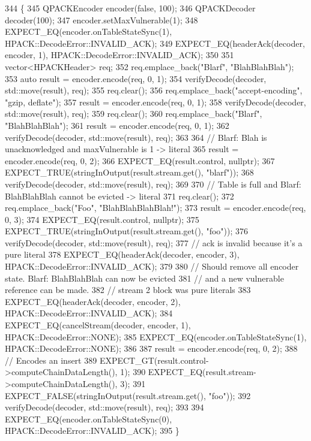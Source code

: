 \begin{DoxyCode}
344                                   \{
345   QPACKEncoder encoder(\textcolor{keyword}{false}, 100);
346   QPACKDecoder decoder(100);
347   encoder.setMaxVulnerable(1);
348   EXPECT\_EQ(encoder.onTableStateSync(1), HPACK::DecodeError::INVALID\_ACK);
349   EXPECT\_EQ(headerAck(decoder, encoder, 1), HPACK::DecodeError::INVALID\_ACK);
350 
351   vector<HPACKHeader> req;
352   req.emplace\_back(\textcolor{stringliteral}{"Blarf"}, \textcolor{stringliteral}{"BlahBlahBlah"});
353   \textcolor{keyword}{auto} result = encoder.encode(req, 0, 1);
354   verifyDecode(decoder, std::move(result), req);
355   req.clear();
356   req.emplace\_back(\textcolor{stringliteral}{"accept-encoding"}, \textcolor{stringliteral}{"gzip, deflate"});
357   result = encoder.encode(req, 0, 1);
358   verifyDecode(decoder, std::move(result), req);
359   req.clear();
360   req.emplace\_back(\textcolor{stringliteral}{"Blarf"}, \textcolor{stringliteral}{"BlahBlahBlah"});
361   result = encoder.encode(req, 0, 1);
362   verifyDecode(decoder, std::move(result), req);
363 
364   \textcolor{comment}{// Blarf: Blah is unacknowledged and maxVulnerable is 1 -> literal}
365   result = encoder.encode(req, 0, 2);
366   EXPECT\_EQ(result.control, \textcolor{keyword}{nullptr});
367   EXPECT\_TRUE(stringInOutput(result.stream.get(), \textcolor{stringliteral}{"blarf"}));
368   verifyDecode(decoder, std::move(result), req);
369 
370   \textcolor{comment}{// Table is full and Blarf: BlahBlahBlah cannot be evicted -> literal}
371   req.clear();
372   req.emplace\_back(\textcolor{stringliteral}{"Foo"}, \textcolor{stringliteral}{"BlahBlahBlahBlah!"});
373   result = encoder.encode(req, 0, 3);
374   EXPECT\_EQ(result.control, \textcolor{keyword}{nullptr});
375   EXPECT\_TRUE(stringInOutput(result.stream.get(), \textcolor{stringliteral}{"foo"}));
376   verifyDecode(decoder, std::move(result), req);
377   \textcolor{comment}{// ack is invalid because it's a pure literal}
378   EXPECT\_EQ(headerAck(decoder, encoder, 3), HPACK::DecodeError::INVALID\_ACK);
379 
380   \textcolor{comment}{// Should remove all encoder state.  Blarf: BlahBlahBlah can now be evicted}
381   \textcolor{comment}{// and a new vulnerable reference can be made.}
382   \textcolor{comment}{// stream 2 block was pure literals}
383   EXPECT\_EQ(headerAck(decoder, encoder, 2), HPACK::DecodeError::INVALID\_ACK);
384   EXPECT\_EQ(cancelStream(decoder, encoder, 1), HPACK::DecodeError::NONE);
385   EXPECT\_EQ(encoder.onTableStateSync(1), HPACK::DecodeError::NONE);
386 
387   result = encoder.encode(req, 0, 2);
388   \textcolor{comment}{// Encodes an insert}
389   EXPECT\_GT(result.control->computeChainDataLength(), 1);
390   EXPECT\_EQ(result.stream->computeChainDataLength(), 3);
391   EXPECT\_FALSE(stringInOutput(result.stream.get(), \textcolor{stringliteral}{"foo"}));
392   verifyDecode(decoder, std::move(result), req);
393 
394   EXPECT\_EQ(encoder.onTableStateSync(0), HPACK::DecodeError::INVALID\_ACK);
395 \}
\end{DoxyCode}

